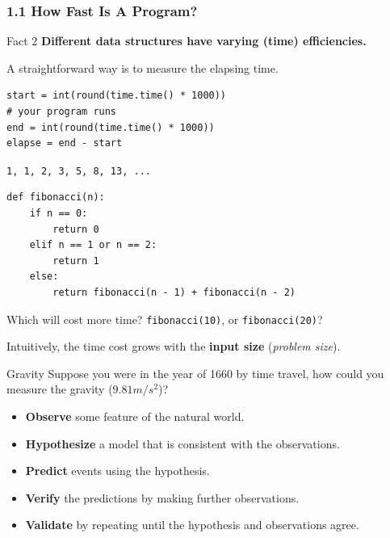 \documentclass[aspectratio=169, 14pt]{beamer}
\begin{document}
\begin{frame}[fragile]
    \frametitle{1.1 How Fast Is A Program?}
    \begin{block}{Fact 2}
        \textbf{Different data structures have varying (time) \alert{efficiencies}.}
    \end{block} 
A straightforward way is to measure the elapsing time.
\begin{verbatim}
start = int(round(time.time() * 1000))
# your program runs
end = int(round(time.time() * 1000))
elapse = end - start    
\end{verbatim}
\end{frame}

\begin{frame}[fragile]
\texttt{1, 1, 2, 3, 5, 8, 13, ...}
    \begin{verbatim}
def fibonacci(n):
    if n == 0:
        return 0
    elif n == 1 or n == 2:
        return 1
    else:
        return fibonacci(n - 1) + fibonacci(n - 2)        
    \end{verbatim}
Which will cost more time? \texttt{fibonacci(10)}, or \texttt{fibonacci(20)}? 

Intuitively, the time cost grows with the \textbf{input size} (\emph{problem size}).
\end{frame}

\begin{frame}
\begin{block}{Gravity}
    Suppose you were in the year of 1660 by time travel, how could you measure the gravity ($9.81 m/s^2$)?
\end{block}
\pause
    \begin{itemize}
        \item \textbf{Observe} some feature of the natural world.
        \item \textbf{Hypothesize} a model that is consistent with the observations.
        \item \textbf{Predict} events using the hypothesis.
        \item \textbf{Verify} the predictions by making further observations.
        \item \textbf{Validate} by repeating until the hypothesis and observations agree.
    \end{itemize}

\end{frame}
\end{document}
